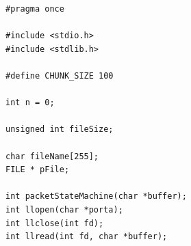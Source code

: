 \documentclass[a4paper,11pt]{article}
\begin{document}
\lstset{language=C,
		showstringspaces=false,
		frame=tb,
		caption=Read.h}
\begin{lstlisting}
#pragma once

#include <stdio.h>
#include <stdlib.h>

#define CHUNK_SIZE 100

int n = 0;

unsigned int fileSize;

char fileName[255];
FILE * pFile;

int packetStateMachine(char *buffer);
int llopen(char *porta);
int llclose(int fd);
int llread(int fd, char *buffer);
\end{lstlisting}

\pagebreak

\lstset{language=C,
		showstringspaces=false,
		frame=tb,
		caption=Read.c}
\end{document}
